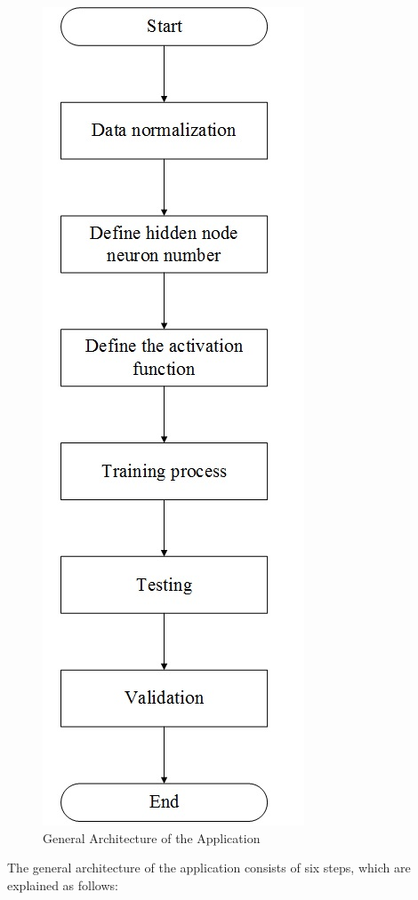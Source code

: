 \documentclass[journal,comsoc]{IEEEtran}
\let\MYoriglatexcaption\caption
\renewcommand{\caption}[2][\relax]{\MYoriglatexcaption[#2]{#2}}
\begin{document}
\begin{figure}[!th]
\centering
\includegraphics[scale=0.2]{general_architecture.jpg}
\caption{General Architecture of the Application}
\label{fig2}
\end{figure}

The general architecture of the application consists of six steps, which are explained as follows:
\end{document}
